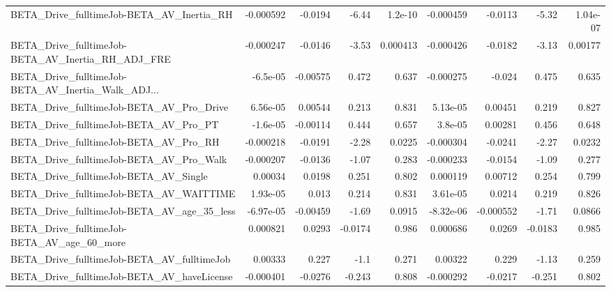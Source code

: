 \begin{tabular}{lrrrrrrrr}
BETA\_Drive\_fulltimeJob-BETA\_AV\_Inertia\_RH          &   -0.000592 &      -0.0194 &    -6.44 &  1.2e-10 &  -0.000459 &     -0.0113 &        -5.32 &      1.04e-07 \\
BETA\_Drive\_fulltimeJob-BETA\_AV\_Inertia\_RH\_ADJ\_FRE  &   -0.000247 &      -0.0146 &    -3.53 & 0.000413 &  -0.000426 &     -0.0182 &        -3.13 &       0.00177 \\
BETA\_Drive\_fulltimeJob-BETA\_AV\_Inertia\_Walk\_ADJ... &    -6.5e-05 &     -0.00575 &    0.472 &    0.637 &  -0.000275 &      -0.024 &        0.475 &         0.635 \\
BETA\_Drive\_fulltimeJob-BETA\_AV\_Pro\_Drive           &    6.56e-05 &      0.00544 &    0.213 &    0.831 &   5.13e-05 &     0.00451 &        0.219 &         0.827 \\
BETA\_Drive\_fulltimeJob-BETA\_AV\_Pro\_PT              &    -1.6e-05 &     -0.00114 &    0.444 &    0.657 &    3.8e-05 &     0.00281 &        0.456 &         0.648 \\
BETA\_Drive\_fulltimeJob-BETA\_AV\_Pro\_RH              &   -0.000218 &      -0.0191 &    -2.28 &   0.0225 &  -0.000304 &     -0.0241 &        -2.27 &        0.0232 \\
BETA\_Drive\_fulltimeJob-BETA\_AV\_Pro\_Walk            &   -0.000207 &      -0.0136 &    -1.07 &    0.283 &  -0.000233 &     -0.0154 &        -1.09 &         0.277 \\
BETA\_Drive\_fulltimeJob-BETA\_AV\_Single              &     0.00034 &       0.0198 &    0.251 &    0.802 &   0.000119 &     0.00712 &        0.254 &         0.799 \\
BETA\_Drive\_fulltimeJob-BETA\_AV\_WAITTIME            &    1.93e-05 &        0.013 &    0.214 &    0.831 &   3.61e-05 &      0.0214 &        0.219 &         0.826 \\
BETA\_Drive\_fulltimeJob-BETA\_AV\_age\_35\_less         &   -6.97e-05 &     -0.00459 &    -1.69 &   0.0915 &  -8.32e-06 &   -0.000552 &        -1.71 &        0.0866 \\
BETA\_Drive\_fulltimeJob-BETA\_AV\_age\_60\_more         &    0.000821 &       0.0293 &  -0.0174 &    0.986 &   0.000686 &      0.0269 &      -0.0183 &         0.985 \\
BETA\_Drive\_fulltimeJob-BETA\_AV\_fulltimeJob         &     0.00333 &        0.227 &     -1.1 &    0.271 &    0.00322 &       0.229 &        -1.13 &         0.259 \\
BETA\_Drive\_fulltimeJob-BETA\_AV\_haveLicense         &   -0.000401 &      -0.0276 &   -0.243 &    0.808 &  -0.000292 &     -0.0217 &       -0.251 &         0.802 \\

\end{tabular}
